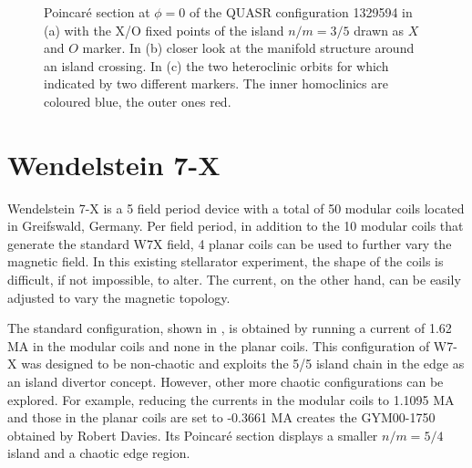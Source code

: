 \begin{figure}[H]
\begin{subfigure}[t]{0.49\textwidth}
        \caption{}
        \label{fig:turn-1329594}
    \end{subfigure}
    \caption{Poincaré section at $\phi=0$ of the QUASR configuration 1329594 in (a) with the X/O fixed points of the island $n/m = 3/5$ drawn as $X$ and $O$ marker. In (b) closer look at the manifold structure around an island crossing. In (c) the two heteroclinic orbits for which indicated by two different markers. The inner homoclinics are coloured blue, the outer ones red.}
    \label{fig:pmt-1329594}
\end{figure}

\section{Wendelstein 7-X}\label{sec:w7x}

Wendelstein 7-X is a 5 field period device with a total of 50 modular coils located in Greifswald, Germany. Per field period, in addition to the 10 modular coils that generate the standard W7X field, 4 planar coils can be used to further vary the magnetic field. In this existing stellarator experiment, the shape of the coils is difficult, if not impossible, to alter. The current, on the other hand, can be easily adjusted to vary the magnetic topology.

The standard configuration, shown in , is obtained by running a current of 1.62 MA in the modular coils and none in the planar coils. This configuration of W7-X was designed to be non-chaotic and exploits the 5/5 island chain in the edge as an island divertor concept. However, other more chaotic configurations can be explored. For example, reducing the currents in the modular coils to 1.1095 MA and those in the planar coils are set to -0.3661 MA creates the GYM00-1750 obtained by Robert Davies. Its Poincar\'e section  displays a smaller $n/m = 5/4$ island and a chaotic edge region.

